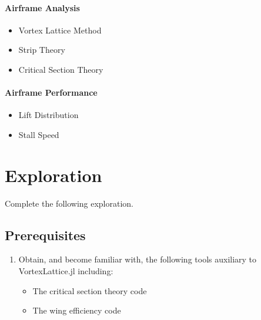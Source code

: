 \documentclass[11pt,twocolumn]{article}
\begin{document}
\paragraph{Airframe Analysis}
\begin{itemize}
	\item Vortex Lattice Method
	\item Strip Theory
	\item Critical Section Theory
\end{itemize}

\paragraph{Airframe Performance}
\begin{itemize}
	\item Lift Distribution
	\item Stall Speed
\end{itemize}



\newpage
\section{Exploration}
\label{sec:exploration}

Complete the following exploration.

\subsection{Prerequisites}
\label{ssec:prereqs}

\begin{enumerate}[label=\roman*.]
	\item Obtain, and become familiar with, the following tools auxiliary to VortexLattice.jl including:
	\begin{itemize}
		\item The critical section theory code
		\item The wing efficiency code
	\end{itemize}
\end{enumerate}
\end{document}
